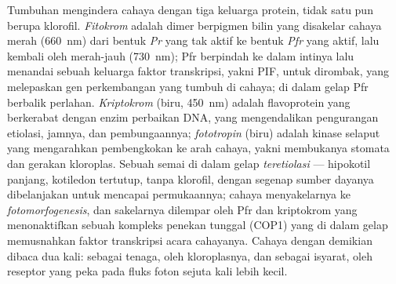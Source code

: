 \begin{definition}[Fotoreseptor]\label{def:b3:plant-molecular-physiology:photoreceptors}
%
Tumbuhan mengindera cahaya dengan tiga keluarga protein, tidak satu pun berupa
klorofil. \emph{Fitokrom} adalah dimer berpigmen bilin yang
disakelar cahaya merah (\qty{660}{nm}) dari bentuk \emph{Pr} yang tak aktif
ke bentuk \emph{Pfr} yang aktif, lalu kembali oleh merah-jauh (\qty{730}{nm}); Pfr
berpindah ke dalam intinya lalu menandai sebuah keluarga faktor transkripsi, yakni
PIF, untuk dirombak, yang melepaskan gen perkembangan yang tumbuh di cahaya;
di dalam gelap Pfr berbalik perlahan. \emph{Kriptokrom} (biru,
\qty{450}{nm}) adalah flavoprotein yang berkerabat dengan enzim perbaikan DNA,
yang mengendalikan pengurangan etiolasi, jamnya, dan pembungaannya; \emph{fototropin}
(biru) adalah kinase selaput yang mengarahkan pembengkokan ke arah cahaya, yakni
membukanya stomata dan gerakan kloroplas. Sebuah semai di dalam
gelap \emph{teretiolasi} --- hipokotil panjang, kotiledon tertutup, tanpa
klorofil, dengan segenap sumber dayanya dibelanjakan untuk mencapai permukaannya; cahaya
menyakelarnya ke \emph{fotomorfogenesis}, dan sakelarnya dilempar oleh
Pfr dan kriptokrom yang menonaktifkan sebuah kompleks penekan tunggal (COP1)
yang di dalam gelap memusnahkan faktor transkripsi acara cahayanya. Cahaya
dengan demikian dibaca dua kali: sebagai tenaga, oleh kloroplasnya, dan
sebagai isyarat, oleh reseptor yang peka pada fluks foton sejuta kali
lebih kecil.
\end{definition}

